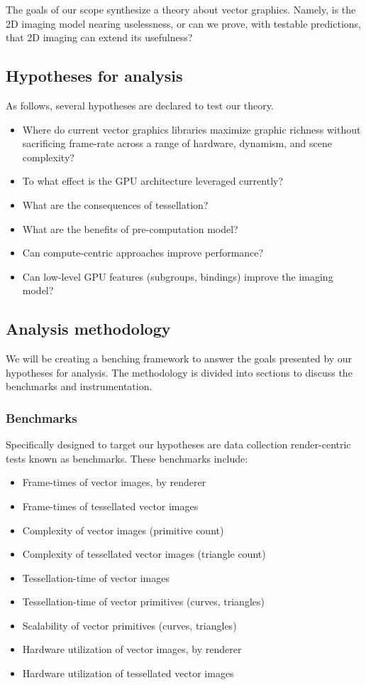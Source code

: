 The goals of our scope synthesize a theory about vector graphics. Namely, is the 2D imaging model nearing uselessness, or can we prove, with testable predictions, that 2D imaging can extend its usefulness?

\subsection{Hypotheses for analysis}

As follows, several hypotheses are declared to test our theory.
\begin{itemize}
  \item Where do current vector graphics libraries maximize graphic richness without sacrificing frame-rate across a range of hardware, dynamism, and scene complexity?
  \item To what effect is the GPU architecture leveraged currently?
  \item What are the consequences of tessellation?
  \item What are the benefits of pre-computation model?
  \item Can compute-centric approaches improve performance?
  \item Can low-level GPU features (subgroups, bindings) improve the imaging model?
\end{itemize}

\subsection{Analysis methodology}

We will be creating a benching framework to answer the goals presented by our hypotheses for analysis. The methodology is divided into sections to discuss the benchmarks and instrumentation.

\subsubsection{Benchmarks}

Specifically designed to target our hypotheses are data collection render-centric tests known as benchmarks. These benchmarks include:

\begin{itemize}
  \item Frame-times of vector images, by renderer
  \item Frame-times of tessellated vector images
  \item Complexity of vector images (primitive count)
  \item Complexity of tessellated vector images (triangle count)
  \item Tessellation-time of vector images
  \item Tessellation-time of vector primitives (curves, triangles)
  \item Scalability of vector primitives (curves, triangles)
  \item Hardware utilization of vector images, by renderer
  \item Hardware utilization of tessellated vector images
\end{itemize}

